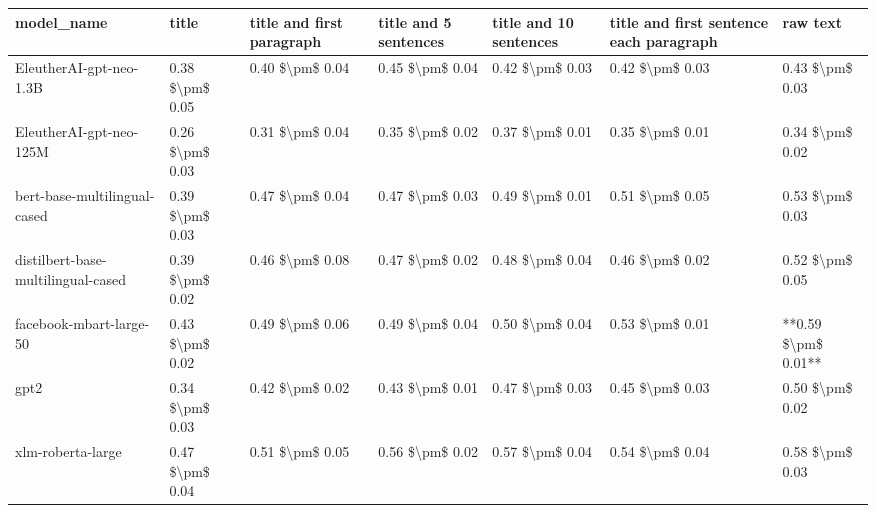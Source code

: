 \begin{tabular}{lllllll}
\toprule
                        model\_name &           title & title and first paragraph & title and 5 sentences & title and 10 sentences & title and first sentence each paragraph &            raw text \\
\midrule
           EleutherAI-gpt-neo-1.3B & 0.38 \$\textbackslash pm\$ 0.05 &           0.40 \$\textbackslash pm\$ 0.04 &       0.45 \$\textbackslash pm\$ 0.04 &        0.42 \$\textbackslash pm\$ 0.03 &                         0.42 \$\textbackslash pm\$ 0.03 &     0.43 \$\textbackslash pm\$ 0.03 \\
           EleutherAI-gpt-neo-125M & 0.26 \$\textbackslash pm\$ 0.03 &           0.31 \$\textbackslash pm\$ 0.04 &       0.35 \$\textbackslash pm\$ 0.02 &        0.37 \$\textbackslash pm\$ 0.01 &                         0.35 \$\textbackslash pm\$ 0.01 &     0.34 \$\textbackslash pm\$ 0.02 \\
      bert-base-multilingual-cased & 0.39 \$\textbackslash pm\$ 0.03 &           0.47 \$\textbackslash pm\$ 0.04 &       0.47 \$\textbackslash pm\$ 0.03 &        0.49 \$\textbackslash pm\$ 0.01 &                         0.51 \$\textbackslash pm\$ 0.05 &     0.53 \$\textbackslash pm\$ 0.03 \\
distilbert-base-multilingual-cased & 0.39 \$\textbackslash pm\$ 0.02 &           0.46 \$\textbackslash pm\$ 0.08 &       0.47 \$\textbackslash pm\$ 0.02 &        0.48 \$\textbackslash pm\$ 0.04 &                         0.46 \$\textbackslash pm\$ 0.02 &     0.52 \$\textbackslash pm\$ 0.05 \\
           facebook-mbart-large-50 & 0.43 \$\textbackslash pm\$ 0.02 &           0.49 \$\textbackslash pm\$ 0.06 &       0.49 \$\textbackslash pm\$ 0.04 &        0.50 \$\textbackslash pm\$ 0.04 &                         0.53 \$\textbackslash pm\$ 0.01 & **0.59 \$\textbackslash pm\$ 0.01** \\
                              gpt2 & 0.34 \$\textbackslash pm\$ 0.03 &           0.42 \$\textbackslash pm\$ 0.02 &       0.43 \$\textbackslash pm\$ 0.01 &        0.47 \$\textbackslash pm\$ 0.03 &                         0.45 \$\textbackslash pm\$ 0.03 &     0.50 \$\textbackslash pm\$ 0.02 \\
                 xlm-roberta-large & 0.47 \$\textbackslash pm\$ 0.04 &           0.51 \$\textbackslash pm\$ 0.05 &       0.56 \$\textbackslash pm\$ 0.02 &        0.57 \$\textbackslash pm\$ 0.04 &                         0.54 \$\textbackslash pm\$ 0.04 &     0.58 \$\textbackslash pm\$ 0.03 \\
\bottomrule
\end{tabular}
